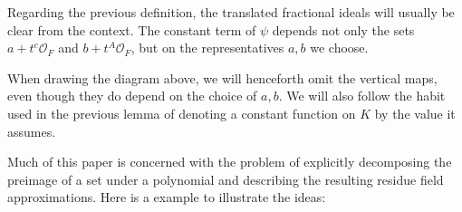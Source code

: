 \documentclass{lmsMODIFIED}
\newcommand{\roi}{\mathcal{O}}
\begin{document}
\begin{remark}
Regarding the previous definition, the translated fractional ideals will usually be clear from the context. The constant term of $\psi$ depends not only the sets $a+t^c\roi_{F}$ and $b+t^A\roi_{F}$, but on the representatives $a,b$ we choose.

When drawing the diagram above, we will henceforth omit the vertical maps, even though they do depend on the choice of $a,b$. We will also follow the habit used in the previous lemma of denoting a constant function on $ K $ by the value it assumes.
\end{remark}

Much of this paper is concerned with the problem of explicitly decomposing the preimage of a set under a polynomial and describing the resulting residue field approximations. Here is a example to illustrate the ideas:
\end{document}
